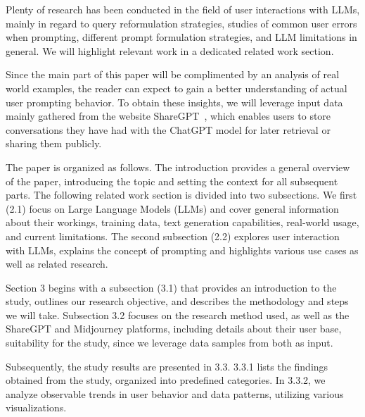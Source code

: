 Plenty of research has been conducted in the field of user interactions with LLMs, mainly in
regard to query reformulation strategies, studies of common user errors when prompting,
different prompt formulation strategies, and LLM limitations in general.
We will highlight relevant work in a dedicated related work section. %

Since the main part of this paper will be complimented by an analysis of real world examples, the
reader can expect to gain a better understanding of actual user prompting behavior.
To obtain these insights, we will leverage input data mainly gathered from the website
ShareGPT~\cite{sharegpt_sharegpt_2023}, %
which enables users to store conversations they have had with the ChatGPT model for later retrieval
or sharing them publicly.


The paper is organized as follows.
The introduction provides a general overview of the paper, introducing the topic and setting the context for all
subsequent parts.
The following related work section is divided into two subsections.
We first (2.1) focus on Large Language Models (LLMs) and cover general information about their
workings, training data, text generation capabilities, real-world usage, and current limitations.
The second subsection (2.2) explores user interaction with LLMs, explains the concept of
prompting and highlights various use cases as well as related research.

Section 3 begins with a subsection (3.1) that provides an introduction to the study, outlines
our research objective, and describes the methodology and steps we will take.
Subsection 3.2 focuses on the research method used, as well as the ShareGPT and
Midjourney platforms, including details about their user base, suitability for the study, since
we leverage data samples from both as input.

Subsequently, the study results are presented in 3.3.
3.3.1 lists the findings obtained from the study, organized into predefined categories. %
In 3.3.2, we analyze observable trends in user behavior and data patterns, utilizing
various visualizations.

